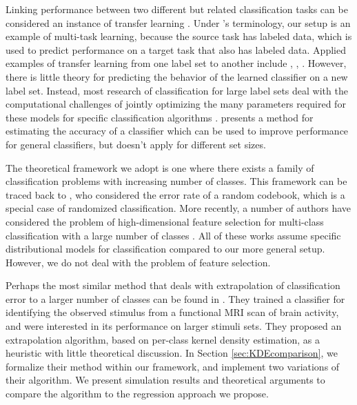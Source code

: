 \documentclass[twoside,11pt]{article}
\begin{document}
Linking performance between two different but related classification
tasks can be considered an instance of transfer learning
\citep{pan2010survey}. Under \citeauthor{pan2010survey}'s terminology,
our setup is an example of multi-task learning, because the source
task has labeled data, which is used to predict performance on a
target task that also has labeled data. Applied examples of transfer learning from one label set to another include \cite{oquab2014learning},
\cite{donahue2014decaf}, \cite{sharif2014cnn}.
However, there is little theory for predicting the behavior of the learned classifier on a new label set. Instead, most research of classification for large label sets deal with the computational challenges of jointly optimizing the many parameters
required for these models for specific classification algorithms \citep{crammer2001algorithmic,
  lee2004multicategory, weston1999support}. \cite{gupta2014training}
presents a method for estimating the accuracy of a classifier which can
be used to improve performance for general classifiers, but doesn't apply for different set sizes.

The theoretical framework we adopt is one where there exists a family
of classification problems with increasing number of classes. This
framework can be traced back to \cite{Shannon1948}, who considered the error rate of a random codebook, which is a special case of randomized classification. More recently, a number of authors have considered the problem of high-dimensional feature selection for multi-class
classification with a large number of classes \citep{pan2016ultrahigh,
  abramovich2015feature, davis2011bayesian}.  All of these works
assume specific distributional models for classification compared to
our more general setup. However, we do not deal with the problem of
feature selection.

Perhaps the most similar method that deals with extrapolation of classification error to a larger number of classes can be found in \cite{Kay2008a}. They trained a classifier for identifying the observed stimulus from a functional MRI scan of brain activity, and were interested in its performance on larger stimuli sets. They proposed an extrapolation algorithm, based on per-class kernel density estimation, as a heuristic with little theoretical discussion. In Section \ref{sec:KDEcomparison}, we formalize their method within our framework, and implement two variations of their algorithm. We present simulation results and theoretical arguments to compare the algorithm to the regression approach we propose.
\end{document}
